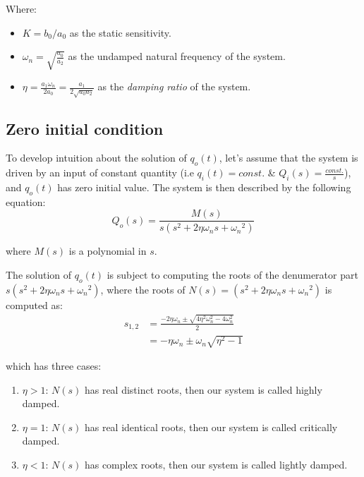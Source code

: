 \documentclass[a4paper,11pt]{book}
\begin{document}
Where: \begin{itemize}
\item $K = b_0/a_0$ as the static sensitivity.
\item $\omega_n=\sqrt{\frac{a_0}{a_2}}$ as the undamped natural frequency of the system.
\item $\eta = \frac{a_1 \omega_n}{ 2a_0} = \frac{a_1}{2 \sqrt{a_0a_2}}$ as the \emph{damping ratio} of the system.
\end{itemize} 

\subsection*{Zero initial condition}
To develop intuition about the solution of $q_o(t)$, let's assume that the system is driven by an input of constant quantity (i.e $q_i(t)=const.$ \& $Q_i(s)=\frac{const.}{s}$), and $q_o(t)$ has zero initial value. The system is then described by the following equation:
\begin{equation}\label{eqn:zi-second-order}
Q_o(s) = \frac{ M(s) }{ s(s^2 + 2 \eta \omega_n s + {\omega_n}^2)}
\end{equation}

where $M(s)$ is a polynomial in $s$.

The solution of $q_o(t)$ is subject to computing the roots of the denumerator part $s(s^2 + 2 \eta \omega_n s + {\omega_n}^2)$, where the roots of  $N(s)=(s^2 + 2 \eta \omega_n s + {\omega_n}^2)$ is computed as:
\begin{align}
s_{1,2} &= \frac{-2\eta \omega_n \pm \sqrt{4\eta^2 \omega_n^2 - 4 \omega_n^2}}{2} \\
 &= -\eta \omega_n \pm \omega_n \sqrt{\eta^2 - 1}
\end{align}

which has three cases:
\begin{enumerate}
\item $\eta > 1$: $N(s)$ has real distinct roots, then our system is called highly damped.
\item $\eta = 1$: $N(s)$ has real identical roots, then our system is called critically damped.
\item $\eta < 1$: $N(s)$ has complex roots, then our system is called lightly damped.
\end{enumerate}
\end{document}
